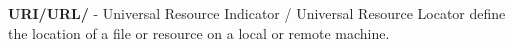 {\bfseries U\+R\+I/\+U\+R\+L/} -\/ Universal Resource Indicator / Universal Resource Locator define the location of a file or resource on a local or remote machine. 